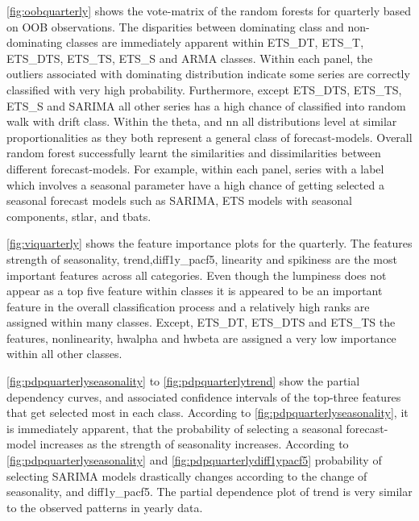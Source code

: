 \documentclass[11pt,a4paper,]{article}
\begin{document}
\autoref{fig:oobquarterly} shows the vote-matrix of the random forests for quarterly based on OOB observations. The disparities between dominating class and non-dominating classes are immediately apparent within ETS\_DT, ETS\_T, ETS\_DTS, ETS\_TS, ETS\_S and ARMA classes. Within each panel, the outliers associated with dominating distribution indicate some series are correctly classified with very high probability. Furthermore, except ETS\_DTS, ETS\_TS, ETS\_S and SARIMA all other series has a high chance of classified into random walk with drift class. Within the theta, and nn all distributions level at similar proportionalities as they both represent a general class of forecast-models. Overall random forest successfully learnt the similarities and dissimilarities between different forecast-models. For example, within each panel, series with a label which involves a seasonal parameter have a high chance of getting selected a seasonal forecast models such as SARIMA, ETS models with seasonal components, stlar, and tbats.

\autoref{fig:viquarterly} shows the feature importance plots for the quarterly. The features strength of seasonality, trend,diff1y\_pacf5, linearity and spikiness are the most important features across all categories. Even though the lumpiness does not appear as a top five feature within classes it is appeared to be an important feature in the overall classification process and a relatively high ranks are assigned within many classes. Except, ETS\_DT, ETS\_DTS and ETS\_TS the features, nonlinearity, hwalpha and hwbeta are assigned a very low importance within all other classes.

\autoref{fig:pdpquarterlyseasonality} to \autoref{fig:pdpquarterlytrend} show the partial dependency curves, and associated confidence intervals of the top-three features that get selected most in each class. According to \autoref{fig:pdpquarterlyseasonality}, it is immediately apparent, that the probability of selecting a seasonal forecast-model increases as the strength of seasonality increases. According to \autoref{fig:pdpquarterlyseasonality} and \autoref{fig:pdpquarterlydiff1ypacf5} probability of selecting SARIMA models drastically changes according to the change of seasonality, and diff1y\_pacf5. The partial dependence plot of trend is very similar to the observed patterns in yearly data.
\end{document}
